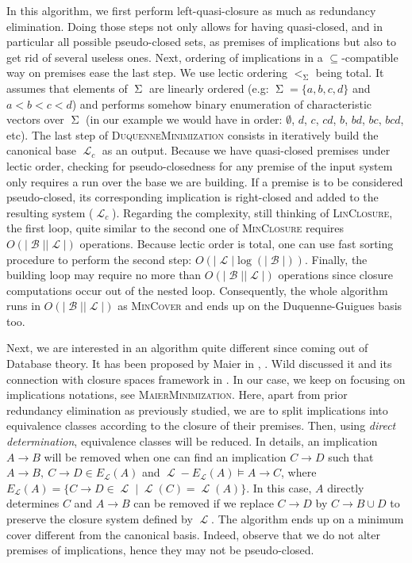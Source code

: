 \documentclass[runningheads]{llncs}
\DeclareMathOperator{\I}{\mathcal{L}}  %
\DeclareMathOperator{\Sg}{\Sigma}  %
\DeclareMathOperator{\imp}{\longrightarrow} %
\DeclareMathOperator{\B}{\mathcal{B}}
\begin{document}
In this algorithm, we first perform left-quasi-closure as much as redundancy elimination. Doing those steps not only allows for having quasi-closed, and in particular all possible pseudo-closed sets, as premises of implications but also
to get rid of several useless ones. Next, ordering of implications in a $\subseteq$-compatible way on premises ease the last step. We use lectic ordering $<_{\Sg}$ being total. It assumes that elements of $\Sg$ are linearly ordered (e.g: $\Sg = \{ a, b, c, d\}$ and $a < b < c < d$) and performs somehow binary enumeration of characteristic vectors over $\Sg$ (in our example we would have in order: $\emptyset$, $d$, $c$, $cd$, $b$, $bd$, $bc$, $bcd$, etc). The last step of \textsc{DuquenneMinimization}  consists in iteratively build the canonical base $\I_c$ as an output. Because we have quasi-closed premises under lectic order, checking for pseudo-closedness for any premise of the input system only requires a run over the base we are building. If a premise is to be considered pseudo-closed, its corresponding implication is right-closed and added to the resulting system ($\I_c$).
Regarding the complexity, still thinking of \textsc{LinClosure}, the first loop,
quite similar to the second one of \textsc{MinClosure} requires $O(|\B||\I|)$ operations. Because lectic order is total, one can use fast sorting procedure to
perform the second step: $O(|\I|\log(|\B|))$. Finally, the building loop may
require no more than $O(|\B||\I|)$ operations since closure computations occur out of the nested loop. Consequently, the whole algorithm runs in $O(|\B||\I|)$ as \textsc{MinCover} and ends up on the Duquenne-Guigues basis too.

Next, we are interested in an algorithm quite different since coming out of Database theory. It has been proposed by Maier in \cite{maier_minimum_1980}, \cite{maier_theory_1983}. Wild discussed it and its connection with closure spaces framework in \cite{wild_implicational_1989}. In our case, we keep on focusing on implications notations, see \textsc{MaierMinimization}. Here, apart from prior redundancy elimination as previously studied, we are to split implications into equivalence classes according to the closure of their premises. Then, using \textit{direct determination}, equivalence classes will be
reduced. In details, an implication $A \imp B$ will be removed when one can find
an implication $C \imp D$ such that $A \imp B, \ C \imp D \in E_{\I}(A)$ and $\I - E_{\I}(A) \models A \imp C$, where $E_{\I}(A) = \{ C \imp D \in \I \; | \; \I(C) = \I(A) \}$. In this case, $A$ directly determines $C$ and
$A \imp B$ can be removed if we replace $C \imp D$ by $C \imp B \cup D$ to preserve the closure system defined by $\I$. The algorithm ends up on a minimum
cover different from the canonical basis. Indeed, observe that we do not alter 
premises of implications, hence they may not be pseudo-closed.
\end{document}
